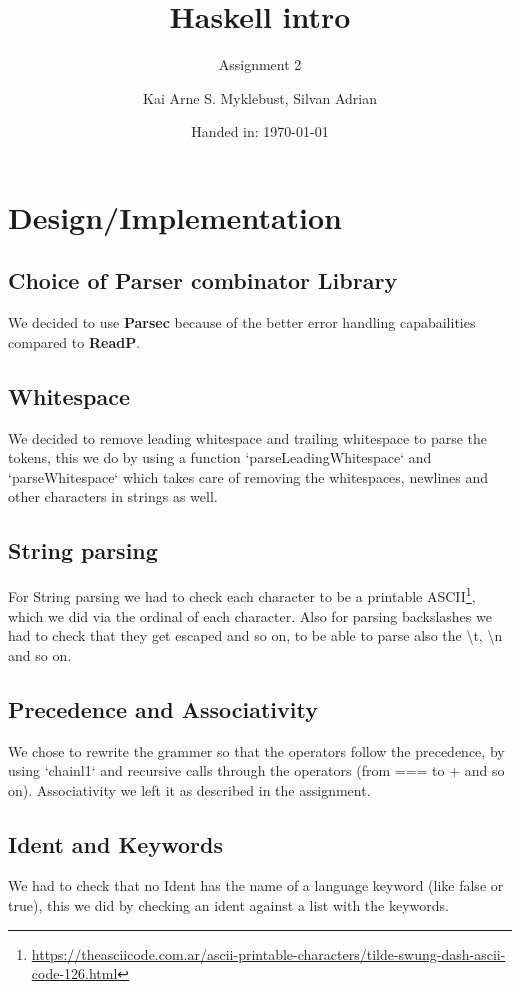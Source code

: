 \documentclass[12pt,a4paper]{article}
\begin{document}
\title{Haskell intro}
\subtitle{Assignment 2}

\author{Kai Arne S. Myklebust, Silvan Adrian}
\date{Handed in: \today}
	
\maketitle
\tableofcontents

\section{Design/Implementation}

\subsection{Choice of Parser combinator Library}
We decided to use \textbf{Parsec} because of the better error handling capabailities compared to \textbf{ReadP}.

\subsection{Whitespace}
We decided to remove leading whitespace and trailing whitespace to parse the tokens, this we do by using a function `parseLeadingWhitespace` and `parseWhitespace` which takes care of removing the whitespaces, newlines and other characters in strings as well.

\subsection{String parsing}
For String parsing we had to check each character to be a printable ASCII\footnote{\url{https://theasciicode.com.ar/ascii-printable-characters/tilde-swung-dash-ascii-code-126.html}}, which we did via the ordinal of each character.
Also for parsing backslashes we had to check that they get escaped and so on, to be able to parse also the \textbackslash{t}, \textbackslash{n} and so on.

\subsection{Precedence and Associativity}
We chose to rewrite the grammer so that the operators follow the precedence, by using `chainl1` and recursive calls through the operators (from === to + and so on).
Associativity we left it as described in the assignment.

\subsection{Ident and Keywords}
We had to check that no Ident has the name of a language keyword (like false or true), this we did by checking an ident against a list with the keywords.
\end{document}
